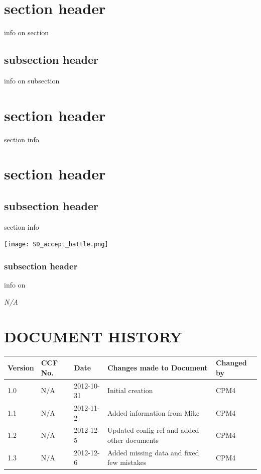 \documentclass{project}
\begin{document}
\section{section header}
info on section
\subsection{subsection header}
info on subsection

\section{section header}
section info

\section{section header}
\subsection{subsection header}
section info
\begin{center}
\texttt{[image: SD\_accept\_battle.png]}
\end{center}

\subsubsection{subsection header}
info on

\clearpage
{}
\begin{thebibliography}{5}
\bibitem{} \emph{N/A}
\end{thebibliography}
\clearpage
{}
\section*{DOCUMENT HISTORY}
\begin{tabular}{|l | l | l | l | l |}
\hline
Version & CCF No. & Date & Changes made to Document & Changed by \\
\hline
1.0 & N/A & 2012-10-31 & Initial creation & CPM4 \\
\hline
1.1 & N/A & 2012-11-2 & Added information from Mike & CPM4 \\
\hline
1.2 & N/A & 2012-12-5 & Updated config ref and added other documents & CPM4 \\
\hline
1.3 & N/A & 2012-12-6 & Added missing data and fixed few mistakes & CPM4 \\
\hline
\end{tabular}
\label{thelastpage}
\end{document}
